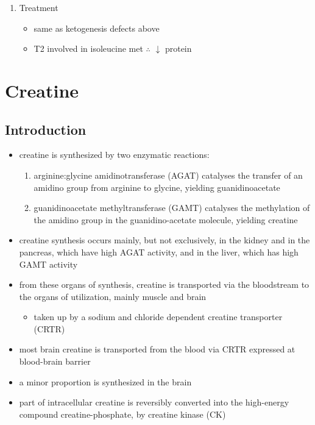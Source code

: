 \documentclass{scrartcl}
\begin{document}
\begin{enumerate}
\item Treatment
\label{sec:orgf858030}
\begin{itemize}
\item same as ketogenesis defects above
\item T2 involved in isoleucine met \(\therefore\) \(\downarrow\) protein
\end{itemize}
\end{enumerate}
\section{Creatine}
\label{sec:org2609bab}
\subsection{Introduction}
\label{sec:org4f426a3}
\begin{itemize}
\item creatine is synthesized by two enzymatic reactions:
\begin{enumerate}
\item arginine:glycine amidinotransferase (AGAT) catalyses the
transfer of an amidino group from arginine to glycine, yielding
guanidinoacetate
\item guanidinoacetate methyltransferase (GAMT) catalyses the
methylation of the amidino group in the guanidino-acetate
molecule, yielding creatine
\end{enumerate}

\item creatine synthesis occurs mainly, but not exclusively, in the kidney
and in the pancreas, which have high AGAT activity, and in the
liver, which has high GAMT activity

\item from these organs of synthesis, creatine is transported via the
bloodstream to the organs of utilization, mainly muscle and brain
\begin{itemize}
\item taken up by a sodium and chloride dependent creatine transporter
(CRTR)
\end{itemize}

\item most brain creatine is transported from the blood via CRTR expressed
at blood-brain barrier
\item a minor proportion is synthesized in the brain

\item part of intracellular creatine is reversibly converted into the
high-energy compound creatine-phosphate, by creatine kinase (CK)


\end{itemize}
\end{document}
